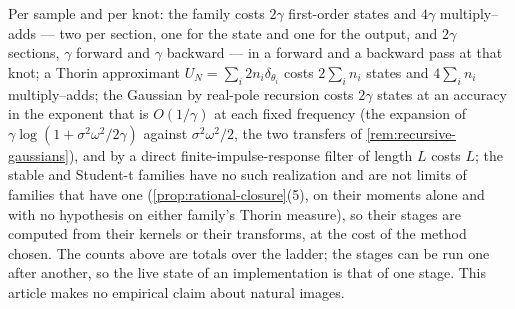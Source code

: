 \begin{remark}[costs]\label{rem:costs}
Per sample and per knot: the \Matern{} family costs $2\gamma$ first-order states and $4\gamma$
multiply--adds --- two per section, one for the state and one for the output, and $2\gamma$
sections, $\gamma$ forward and $\gamma$ backward --- in a forward and a backward pass at that
knot; a Thorin approximant $U_N = \sum_i 2n_i\delta_{\theta_i}$ costs $2\sum_i n_i$ states and
$4\sum_i n_i$ multiply--adds; the Gaussian by
real-pole recursion costs $2\gamma$ states at an accuracy in the exponent that is $O(1/\gamma)$ at each
fixed frequency (the expansion of $\gamma\log(1 + \sigma^2\omega^2/2\gamma)$ against
$\sigma^2\omega^2/2$, the two transfers of \ref{rem:recursive-gaussians}), and by a direct
finite-impulse-response filter of length $L$ costs $L$; the stable and Student-t families have
no such realization and are not limits of families that have one
(\ref{prop:rational-closure}(5), on their moments alone and with no hypothesis on either family's
Thorin measure), so their stages are computed from their kernels or their
transforms, at the cost of the method chosen. The counts above are totals over the ladder; the
stages can be run one after another, so the live state of an implementation is that of one
stage. This article makes no empirical
claim about natural images.
\end{remark}
